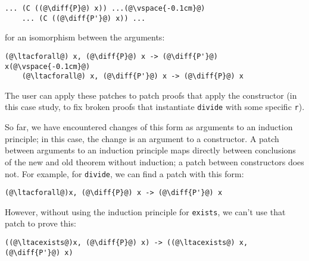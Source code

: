 \begin{lstlisting}[language=coq]
    ... (C ((@\diff{P}@) x)) ...(@\vspace{-0.1cm}@)
    ... (C ((@\diff{P'}@) x)) ...
\end{lstlisting}
for an isomorphism between the arguments:

\begin{lstlisting}[language=coq]
    (@\ltacforall@) x, (@\diff{P}@) x -> (@\diff{P'}@) x(@\vspace{-0.1cm}@)
    (@\ltacforall@) x, (@\diff{P'}@) x -> (@\diff{P}@) x
\end{lstlisting}

The user can apply these patches to patch proofs that apply the constructor (in this case study,
to fix broken proofs that instantiate \lstinline{divide} with some specific \lstinline{r}).

So far, we have encountered changes of this form as arguments to an 
induction principle; in this case, the change is an argument to a constructor.
A patch between arguments to an induction principle maps
directly between conclusions of the new and old theorem without
induction; a patch between constructors does not.
For example, for \lstinline{divide}, we can find a patch with this form:

\begin{lstlisting}[language=coq]
   (@\ltacforall@)x, (@\diff{P}@) x -> (@\diff{P'}@) x
\end{lstlisting}

However, without using the induction principle for \lstinline{exists}, we can't use that patch to prove this:

\begin{lstlisting}[language=coq]
   ((@\ltacexists@)x, (@\diff{P}@) x) -> ((@\ltacexists@) x, (@\diff{P'}@) x)
\end{lstlisting}



